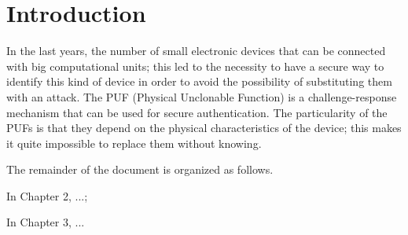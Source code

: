 \chapter{Introduction}

In the last years, the number of small electronic devices that can be connected with big computational units; this led to the necessity to have a secure way to identify this kind of device in order to avoid the possibility of substituting them with an attack.
The PUF (Physical Unclonable Function) is a challenge-response mechanism that can be used for secure authentication.
The particularity of the PUFs is that they depend on the physical characteristics of the device; this makes it quite impossible to replace them without knowing.




The remainder of the document is organized as follows. 


In Chapter 2, ...; 

In Chapter 3, ... 




